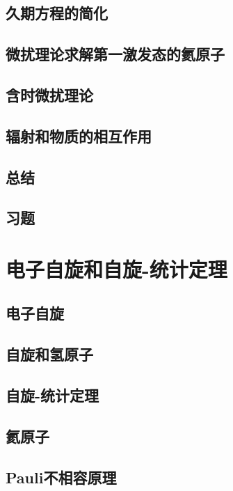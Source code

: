 \documentclass{book}
\begin{document}
	\section{久期方程的简化}
	
	\section{微扰理论求解第一激发态的氦原子}
	
	\section{含时微扰理论}
	
	\section{辐射和物质的相互作用}
	
	\section*{总结}
	
	\section*{习题}
	
	\chapter{电子自旋和自旋-统计定理}
	\section{电子自旋}
	
	\section{自旋和氢原子}
	
	\section{自旋-统计定理}
	
	\section{氦原子}
	
	\section{Pauli不相容原理}
	
\end{document}
